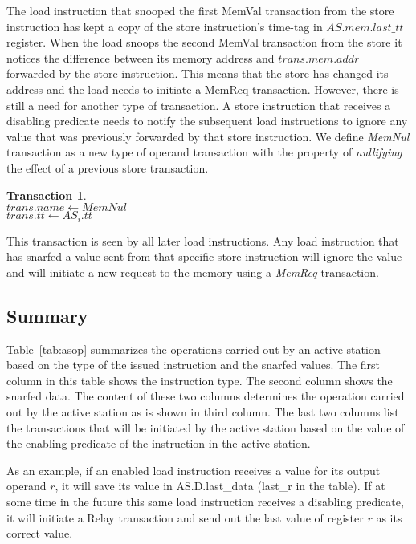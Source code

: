 \documentclass[10pt,twocolumn]{IEEEtran}
\newtheorem{trans}{Transaction}
\begin{document}
The load instruction that snooped the f{ir}st MemVal transaction from the store
instruction has kept a copy of the store instruction's 
time-tag in $AS.mem.last\_tt$
register.  When the load snoops the second MemVal transaction from the store
it notices the difference between its memory address and $trans.mem.addr$
forwarded by the store instruction.  This means that the store has changed
its address and the load needs to initiate a MemReq transaction.
However, there is still a need for another type of transaction.  A store
instruction that receives a disabling predicate needs to notify the subsequent
load instructions to ignore any value that was previously forwarded by 
that store instruction.  We define \emph{MemNul} transaction as 
a new type of operand transaction with the property of
\emph{nullifying} the effect of a previous store transaction.
%
\begin{trans}
\mbox{} \\
\indent $trans.name \leftarrow MemNul$ \\
\indent $trans.tt \leftarrow AS_i.tt$ \\
\end{trans}
%
This transaction is seen by all
later load instructions.  Any load instruction that has snarfed a
value sent from that specific store instruction will ignore the
value and will initiate a new request to the memory using a \emph{MemReq}
transaction.
%
%
\subsection{Summary}
%
Table~\ref{tab:asop} summarizes the operations carried out by an
active station based on the type of the issued instruction and the
snarfed values.  The f{ir}st column in this table shows the instruction
type.  The second column shows the snarfed data.  
The content of these two columns
determines the operation carried out by the active station as is
shown in third column.  The last two columns list the transactions
that will be initiated by the active station based on the value of
the enabling predicate of the instruction in the active station.

As an example, if an enabled load instruction receives a value for its
output operand $r$, it will save its value in AS.D.last\_data (last\_r in
the table).  If at some time in the future this same load instruction receives a disabling
predicate, it will initiate a Relay transaction and send out the last value of
register $r$ as its correct value.
\end{document}
